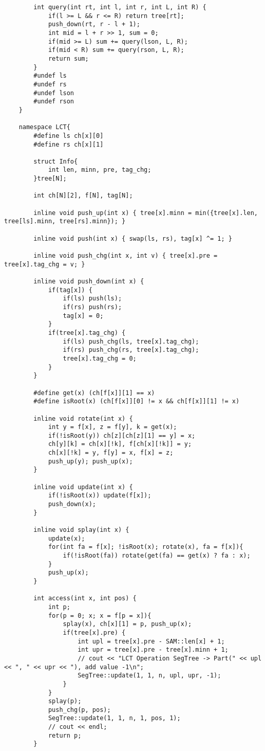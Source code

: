 \documentclass[]{article}
\begin{document}
\begin{verbatim}
        int query(int rt, int l, int r, int L, int R) {
            if(l >= L && r <= R) return tree[rt];
            push_down(rt, r - l + 1);
            int mid = l + r >> 1, sum = 0;
            if(mid >= L) sum += query(lson, L, R);
            if(mid < R) sum += query(rson, L, R);
            return sum;
        }
        #undef ls
        #undef rs
        #undef lson
        #undef rson
    }

    namespace LCT{
        #define ls ch[x][0]
        #define rs ch[x][1]

        struct Info{
            int len, minn, pre, tag_chg;
        }tree[N];

        int ch[N][2], f[N], tag[N];

        inline void push_up(int x) { tree[x].minn = min({tree[x].len, tree[ls].minn, tree[rs].minn}); }

        inline void push(int x) { swap(ls, rs), tag[x] ^= 1; }

        inline void push_chg(int x, int v) { tree[x].pre = tree[x].tag_chg = v; }

        inline void push_down(int x) {
            if(tag[x]) {
                if(ls) push(ls);
                if(rs) push(rs);
                tag[x] = 0;
            }
            if(tree[x].tag_chg) {
                if(ls) push_chg(ls, tree[x].tag_chg);
                if(rs) push_chg(rs, tree[x].tag_chg);
                tree[x].tag_chg = 0;
            }
        }

        #define get(x) (ch[f[x]][1] == x)                      
        #define isRoot(x) (ch[f[x]][0] != x && ch[f[x]][1] != x) 

        inline void rotate(int x) {
            int y = f[x], z = f[y], k = get(x);
            if(!isRoot(y)) ch[z][ch[z][1] == y] = x;
            ch[y][k] = ch[x][!k], f[ch[x][!k]] = y;
            ch[x][!k] = y, f[y] = x, f[x] = z;
            push_up(y); push_up(x);
        }

        inline void update(int x) { 
            if(!isRoot(x)) update(f[x]);
            push_down(x);
        }

        inline void splay(int x) {
            update(x);
            for(int fa = f[x]; !isRoot(x); rotate(x), fa = f[x]){
                if(!isRoot(fa)) rotate(get(fa) == get(x) ? fa : x);
            }
            push_up(x);
        }

        int access(int x, int pos) {
            int p;
            for(p = 0; x; x = f[p = x]){
                splay(x), ch[x][1] = p, push_up(x);
                if(tree[x].pre) {
                    int upl = tree[x].pre - SAM::len[x] + 1;
                    int upr = tree[x].pre - tree[x].minn + 1;
                    // cout << "LCT Operation SegTree -> Part(" << upl << ", " << upr << "), add value -1\n";
                    SegTree::update(1, 1, n, upl, upr, -1);
                }
            }
            splay(p);
            push_chg(p, pos);
            SegTree::update(1, 1, n, 1, pos, 1);
            // cout << endl;
            return p;
        }


\end{verbatim}
\end{document}
